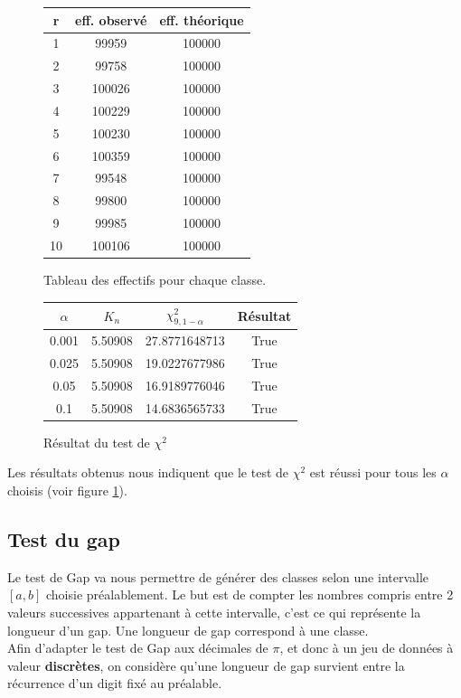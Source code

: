\documentclass[10pt,a4paper]{article}
\begin{document}
\begin{figure}[H]
\begin{center}
\begin{longtable}{|c|c|c|}
\hline
r & eff. observé & eff. théorique\\
\hline
1 & 99959 & 100000\\
2 & 99758 & 100000\\
3 & 100026 & 100000\\
4 & 100229 & 100000\\
5 & 100230 & 100000\\
6 & 100359 & 100000\\
7 & 99548 & 100000\\
8 & 99800 & 100000\\
9 & 99985 & 100000\\
10 & 100106 & 100000\\
\hline
\end{longtable}
\end{center}
\caption{Tableau des effectifs pour chaque classe.}
\end{figure}
\begin{figure}[H]
\begin{center}
\begin{tabular}{|c|c|c|c|}
\hline
$\alpha$ & $K_{n}$ & $\chi^2_{9, 1 - \alpha}$ & Résultat\\
\hline
0.001 & 5.50908 & 27.8771648713 & True\\
0.025 & 5.50908 & 19.0227677986 & True\\
0.05 & 5.50908 & 16.9189776046 & True\\
0.1 & 5.50908 & 14.6836565733 & True\\
\hline
\end{tabular}
\end{center}
\caption{Résultat du test de $\chi^2$}
\label{result1}
\end{figure}

Les résultats obtenus nous indiquent que le test de $\chi^2$ est réussi pour tous les $\alpha$ choisis (voir figure \ref{result1}).
\subsection{Test du gap}

Le test de Gap va nous permettre de générer des classes selon une intervalle $[a, b]$ choisie préalablement. Le but est de compter les nombres compris entre 2 valeurs successives appartenant à cette intervalle, c'est ce qui représente la longueur d'un gap. Une longueur de gap correspond à une classe.\\
Afin d'adapter le test de Gap aux décimales de $\pi$, et donc à un jeu de données à valeur \textbf{discrètes}, on considère qu'une longueur de gap survient entre la récurrence d'un digit fixé au préalable.\\
\end{document}
